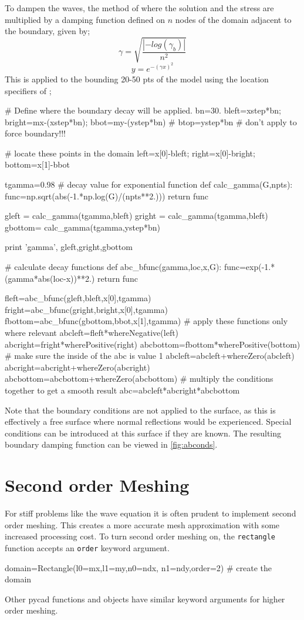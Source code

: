 To dampen the waves, the method of \citet{Cerjan1985}
where the solution and the stress are multiplied by a damping function defined
on $n$ nodes of the domain adjacent to the boundary, given by;
\begin{equation}
\gamma =\sqrt{\frac{| -log( \gamma _{b} ) |}{n^2}}
\end{equation}
\begin{equation}
y=e^{-(\gamma x)^2}
\end{equation}
This is applied to the bounding 20-50 pts of the model using the location
specifiers of \esc;
\begin{python}
# Define where the boundary decay will be applied.
bn=30.
bleft=xstep*bn; bright=mx-(xstep*bn); bbot=my-(ystep*bn)
# btop=ystep*bn # don't apply to force boundary!!!

# locate these points in the domain
left=x[0]-bleft; right=x[0]-bright; bottom=x[1]-bbot

tgamma=0.98   # decay value for exponential function
def calc_gamma(G,npts):
    func=np.sqrt(abs(-1.*np.log(G)/(npts**2.)))
    return func

gleft  = calc_gamma(tgamma,bleft)
gright = calc_gamma(tgamma,bleft)
gbottom= calc_gamma(tgamma,ystep*bn)

print 'gamma', gleft,gright,gbottom

# calculate decay functions
def abc_bfunc(gamma,loc,x,G):
    func=exp(-1.*(gamma*abs(loc-x))**2.)
    return func

fleft=abc_bfunc(gleft,bleft,x[0],tgamma)
fright=abc_bfunc(gright,bright,x[0],tgamma)
fbottom=abc_bfunc(gbottom,bbot,x[1],tgamma)
# apply these functions only where relevant
abcleft=fleft*whereNegative(left)
abcright=fright*wherePositive(right)
abcbottom=fbottom*wherePositive(bottom)
# make sure the inside of the abc is value 1
abcleft=abcleft+whereZero(abcleft)
abcright=abcright+whereZero(abcright)
abcbottom=abcbottom+whereZero(abcbottom)
# multiply the conditions together to get a smooth result
abc=abcleft*abcright*abcbottom
\end{python}
Note that the boundary conditions are not applied to the surface, as this is
effectively a free surface where normal reflections would be experienced.
Special conditions can be introduced at this surface if they are known. The
resulting boundary damping function can be viewed in
\autoref{fig:abconds}.

\section{Second order Meshing}
For stiff problems like the wave equation it is often prudent to implement
second order meshing. This creates a more accurate mesh approximation with some
increased processing cost. To turn second order meshing on, the \verb!rectangle!
function accepts an \verb!order! keyword argument.
\begin{python}
domain=Rectangle(l0=mx,l1=my,n0=ndx, n1=ndy,order=2) # create the domain
\end{python}
Other pycad functions and objects have similar keyword arguments for higher
order meshing.

